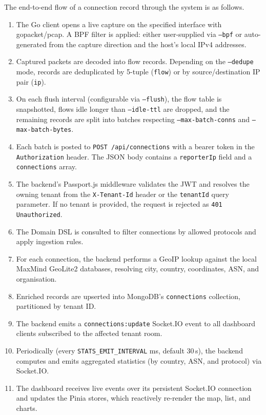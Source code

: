 \documentclass[12pt]{report}
\begin{document}
The end-to-end flow of a connection record through the system is as follows.

\begin{enumerate}
    \item The Go client opens a live capture on the specified interface with gopacket/pcap.
          A BPF filter is applied: either user-supplied via \texttt{--bpf} or auto-generated
          from the capture direction and the host's local IPv4 addresses.
    \item Captured packets are decoded into flow records. Depending on the \texttt{--dedupe}
          mode, records are deduplicated by 5-tuple (\texttt{flow}) or by source/destination
          IP pair (\texttt{ip}).
    \item On each flush interval (configurable via \texttt{--flush}), the flow table is
          snapshotted, flows idle longer than \texttt{--idle-ttl} are dropped, and the
          remaining records are split into batches respecting \texttt{--max-batch-conns} and
          \texttt{--max-batch-bytes}.
    \item Each batch is posted to \texttt{POST /api/connections} with a bearer token in the
          \texttt{Authorization} header. The JSON body contains a
          \texttt{reporterIp} field and a \texttt{connections} array.
    \item The backend's Passport.js middleware validates the JWT and resolves the owning
          tenant from the \texttt{X-Tenant-Id} header or the \texttt{tenantId} query
          parameter. If no tenant is provided, the request is rejected as
          \texttt{401 Unauthorized}.
    \item The Domain DSL is consulted to filter connections by allowed protocols and apply
          ingestion rules.
    \item For each connection, the backend performs a GeoIP lookup against the local MaxMind
          GeoLite2 databases, resolving city, country, coordinates, ASN, and organisation.
    \item Enriched records are upserted into MongoDB's \texttt{connections} collection,
          partitioned by tenant ID.
    \item The backend emits a \texttt{connections:update} Socket.IO event to all dashboard
          clients subscribed to the affected tenant room.
    \item Periodically (every \texttt{STATS\_EMIT\_INTERVAL} ms, default 30\,s), the backend
          computes and emits aggregated statistics (by country, ASN, and protocol) via
          Socket.IO.
    \item The dashboard receives live events over its persistent Socket.IO connection and
          updates the Pinia stores, which reactively re-render the map, list, and charts.
\end{enumerate}
\end{document}
